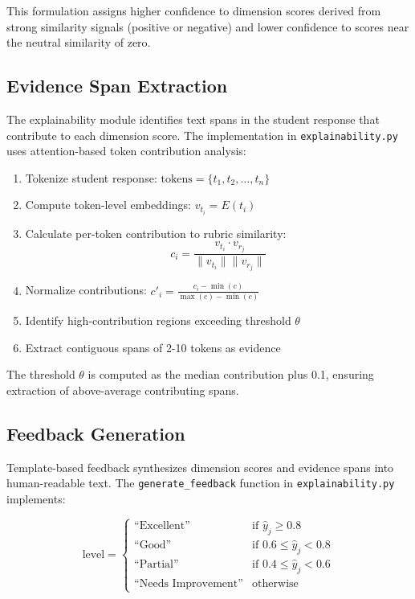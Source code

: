 \documentclass[conference]{IEEEtran}
\begin{document}
This formulation assigns higher confidence to dimension scores derived from strong similarity signals (positive or negative) and lower confidence to scores near the neutral similarity of zero.

\subsection{Evidence Span Extraction}
The explainability module identifies text spans in the student response that contribute to each dimension score. The implementation in \texttt{explainability.py} uses attention-based token contribution analysis:

\begin{enumerate}
    \item Tokenize student response: $\text{tokens} = \{t_1, t_2, \ldots, t_n\}$
    \item Compute token-level embeddings: $v_{t_i} = E(t_i)$
    \item Calculate per-token contribution to rubric similarity:
    \begin{equation}
        c_i = \frac{v_{t_i} \cdot v_{r_j}}{\|v_{t_i}\| \|v_{r_j}\|}
    \end{equation}
    \item Normalize contributions: $c'_i = \frac{c_i - \min(c)}{\max(c) - \min(c)}$
    \item Identify high-contribution regions exceeding threshold $\theta$
    \item Extract contiguous spans of 2-10 tokens as evidence
\end{enumerate}

The threshold $\theta$ is computed as the median contribution plus 0.1, ensuring extraction of above-average contributing spans.

\subsection{Feedback Generation}
Template-based feedback synthesizes dimension scores and evidence spans into human-readable text. The \texttt{generate\_feedback} function in \texttt{explainability.py} implements:

\begin{equation}
    \text{level} = \begin{cases}
        \text{``Excellent''} & \text{if } \hat{y}_j \geq 0.8 \\
        \text{``Good''} & \text{if } 0.6 \leq \hat{y}_j < 0.8 \\
        \text{``Partial''} & \text{if } 0.4 \leq \hat{y}_j < 0.6 \\
        \text{``Needs Improvement''} & \text{otherwise}
    \end{cases}
\end{equation}
\end{document}

